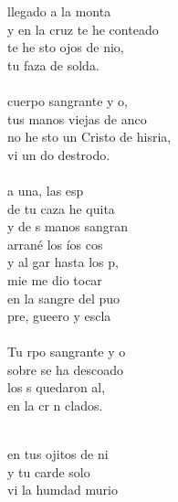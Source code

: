 \begin{cancion}%
	llegado a la monta\\
	y en la cruz te he conteado\\
	te he sto ojos de nio,\\
	tu faza de solda.\\
\jump\\
	cuerpo sangrante y o,\\
	tus manos viejas de anco\\
	no he sto un Cristo de hisria,\\
	vi un do destrodo.\\
\jump\\
	 a una, las esp\\
	de tu caza he quita\\
	y de s manos sangran\\
	arrané los íos cos\\
	y al gar hasta los p,\\
	mie me dio tocar\\
	en la sangre del puo\\
	pre, gueero y escla\\
\jump\\
	Tu rpo sangrante y o\\
	sobre  se ha descoado\\
	los s quedaron al, \\
	en la cr n clados.\\\jump\\
	\begin{chorus}%
	en tus ojitos de ni\\
	y tu carde solo\\
	vi la humdad murio\\

\end{chorus}
\end{cancion}
